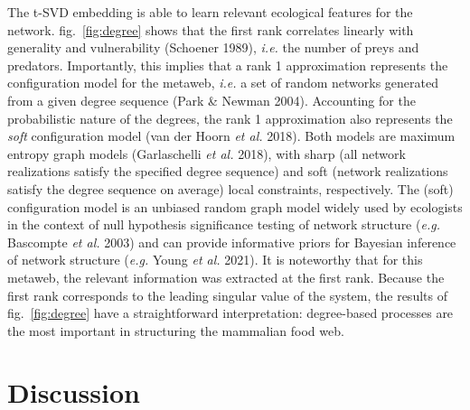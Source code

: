 \documentclass[11pt]{article}
\begin{document}
The t-SVD embedding is able to learn relevant ecological features for
the network. fig.~\ref{fig:degree} shows that the first rank correlates
linearly with generality and vulnerability (Schoener 1989), \emph{i.e.}
the number of preys and predators. Importantly, this implies that a rank
1 approximation represents the configuration model for the metaweb,
\emph{i.e.} a set of random networks generated from a given degree
sequence (Park \& Newman 2004). Accounting for the probabilistic nature
of the degrees, the rank 1 approximation also represents the \emph{soft}
configuration model (van der Hoorn \emph{et al.} 2018). Both models are
maximum entropy graph models (Garlaschelli \emph{et al.} 2018), with
sharp (all network realizations satisfy the specified degree sequence)
and soft (network realizations satisfy the degree sequence on average)
local constraints, respectively. The (soft) configuration model is an
unbiased random graph model widely used by ecologists in the context of
null hypothesis significance testing of network structure (\emph{e.g.}
Bascompte \emph{et al.} 2003) and can provide informative priors for
Bayesian inference of network structure (\emph{e.g.} Young \emph{et al.}
2021). It is noteworthy that for this metaweb, the relevant information
was extracted at the first rank. Because the first rank corresponds to
the leading singular value of the system, the results of
fig.~\ref{fig:degree} have a straightforward interpretation:
degree-based processes are the most important in structuring the
mammalian food web.

\hypertarget{discussion}{%
\section{Discussion}\label{discussion}}
\end{document}
